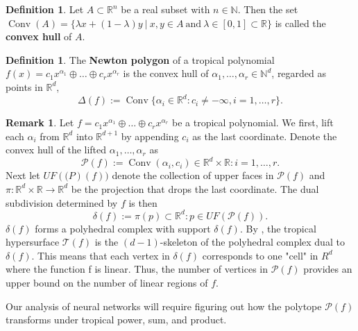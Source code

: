 \documentclass{article}
\theoremstyle{definition}
\newtheorem{definition}[theorem]{Definition}
\newtheorem{remark}[theorem]{Remark}
\DeclareMathOperator{\Conv}{Conv}
\begin{document}
\begin{definition}
Let $A \subset \mathbb{R}^{n}$ be a real subset with $n \in \mathbb{N}$. Then the set $\Conv(A) = \{\lambda x + (1- \lambda)y \ | \ x, y \in A \ \text{and} \ \lambda \in [0,1] \subset \mathbb{R}\}$ is called the \textbf{convex hull} of $A$.
\end{definition}

\begin{definition}\hspace{1sp}\cite[p.~3]{zhang2018tropical}
The \textbf{Newton polygon} of a tropical polynomial $f(x) = c_1 x^{\alpha_1} \oplus \dots \oplus c_r x^{\alpha_r}$  is the convex hull of $\alpha_1 , \dots , \alpha_r \in \mathbb{N}^{d}$, regarded as points in $\mathbb{R}^{d}$,
$$ \Delta(f) := \Conv\{\alpha_i \in \mathbb{R}^{d} : c_i \neq -\infty , i = 1, \dots ,r \}. $$
\end{definition}

\begin{remark}\hspace{1sp}\cite[p.~3]{zhang2018tropical}
\label{rem:subdivision}
Let $f = c_1 x^{\alpha_1} \oplus \dots \oplus c_r x^{\alpha_r}$ be a tropical polynomial. We first, lift each $\alpha_i$ from $\mathbb{R}^d$ into $\mathbb{R}^{d+1}$ by appending $c_i$ as the last coordinate. Denote the convex hull of the lifted $\alpha_1, \dots , \alpha_r$ as
$$\mathcal{P}(f):= \Conv{(\alpha_i, c_i) \in \mathbb{R}^{d} \times \mathbb{R} : i = 1, \dots , r}.$$
Next let $UF(\mathcal(P)(f))$ denote the collection of upper faces in $\mathcal{P}(f)$ and $\pi : \mathbb{R}^{d} \times \mathbb{R} \to \mathbb{R}^{d}$ be the projection that drops
the last coordinate. The dual subdivision determined by $f$
is then
$$\delta(f) := {\pi(p) \subset \mathbb{R}^{d} : p \in UF( \mathcal{P}(f))}.$$
$\delta (f)$ forms a polyhedral complex with support $\delta (f)$. By \cite[Proposition 3.1.6.]{maclagan2015introduction}, the tropical hypersurface $\mathcal{T}(f)$ is the $(d - 1)$-skeleton of the polyhedral complex dual to $ \delta(f)$. This means that each vertex in $ \delta(f)$ corresponds to one "cell" in $R^{d}$ where the function f is linear. Thus, the number of vertices in $\mathcal{P}(f)$ provides an upper bound on the number of linear regions of $f$.
\end{remark}

Our analysis of neural networks will require figuring out
how the polytope $\mathcal{P}(f)$ transforms under tropical power,
sum, and product.
\end{document}
